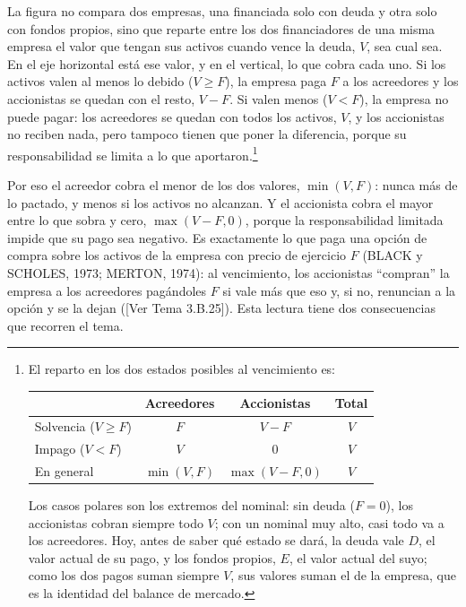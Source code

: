 \documentclass[10pt,a4paper]{article}
\newcommand{\authorfont}[1]{{\fontfamily{EBGaramond-TLF}\selectfont #1}}
\begin{document}
La figura no compara dos empresas, una financiada solo con deuda y otra solo con fondos propios, sino que reparte entre los dos financiadores de una misma empresa el valor que tengan sus activos cuando vence la deuda, $V$, sea cual sea. En el eje horizontal está ese valor, y en el vertical, lo que cobra cada uno. Si los activos valen al menos lo debido ($V\geq F$), la empresa paga $F$ a los acreedores y los accionistas se quedan con el resto, $V-F$. Si valen menos ($V<F$), la empresa no puede pagar: los acreedores se quedan con todos los activos, $V$, y los accionistas no reciben nada, pero tampoco tienen que poner la diferencia, porque su responsabilidad se limita a lo que aportaron.\footnote{%
    El reparto en los dos estados posibles al vencimiento es:
    \begin{center}
    \begin{tabular}{lccc}
        & Acreedores & Accionistas & Total \\ \hline
        Solvencia ($V\geq F$) & $F$ & $V-F$ & $V$ \\
        Impago ($V<F$) & $V$ & $0$ & $V$ \\ \hline
        En general & $\min(V,F)$ & $\max(V-F,0)$ & $V$ \\
    \end{tabular}
    \end{center}
    Los casos polares son los extremos del nominal: sin deuda ($F=0$), los accionistas cobran siempre todo $V$; con un nominal muy alto, casi todo va a los acreedores. Hoy, antes de saber qué estado se dará, la deuda vale $D$, el valor actual de su pago, y los fondos propios, $E$, el valor actual del suyo; como los dos pagos suman siempre $V$, sus valores suman el de la empresa, que es la identidad del balance de mercado.
}

Por eso el acreedor cobra el menor de los dos valores, $\min(V,F)$: nunca más de lo pactado, y menos si los activos no alcanzan. Y el accionista cobra el mayor entre lo que sobra y cero, $\max(V-F,0)$, porque la responsabilidad limitada impide que su pago sea negativo. Es exactamente lo que paga una opción de compra sobre los activos de la empresa con precio de ejercicio $F$ (BLACK y SCHOLES, 1973; MERTON, 1974): al vencimiento, los accionistas ``compran'' la empresa a los acreedores pagándoles $F$ si vale más que eso y, si no, renuncian a la opción y se la dejan ([\authorfont{Ver Tema 3.B.25}]). Esta lectura tiene dos consecuencias que recorren el tema.
\end{document}
